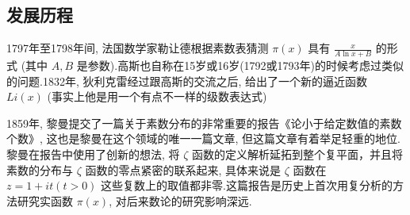 \documentclass[main]{subfiles}
\begin{document}
\subsection{发展历程}
1797年至1798年间, 法国数学家勒让德根据素数表猜测 $\pi (x)$ 具有 $\frac{x}{A\ln x + B}$ 的形式 (其中 $A,B$ 是参数).高斯也自称在15岁或16岁(1792或1793年)的时候考虑过类似的问题.1832年, 狄利克雷经过跟高斯的交流之后, 给出了一个新的逼近函数 $Li(x)$ (事实上他是用一个有点不一样的级数表达式)
\par 1859年, 黎曼提交了一篇关于素数分布的非常重要的报告《论小于给定数值的素数个数》, 这也是黎曼在这个领域的唯一一篇文章, 但这篇文章有着举足轻重的地位.黎曼在报告中使用了创新的想法, 将
 $\zeta$ 函数的定义解析延拓到整个复平面，并且将素数的分布与
 $\zeta$ 函数的零点紧密的联系起来, 具体来说是 $\zeta $ 函数在 $z = 1 + it (t>0)$ 这些复数上的取值都非零.这篇报告是历史上首次用复分析的方法研究实函数 $\pi(x)$, 对后来数论的研究影响深远.
\end{document}
